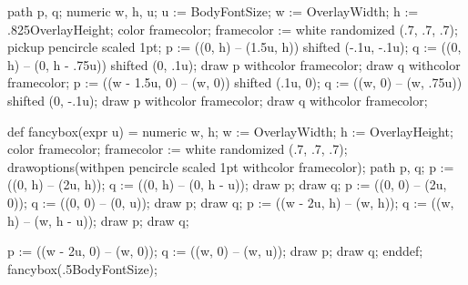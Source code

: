 \setupinteraction[state=start, focus=standard, color=darkred]
\setuppapersize[A4][A4]
\setuplayout[backspace=2.5cm,width=16.5cm,
             topspace=1.5cm,header=1.5cm,
             height=27.2cm,footer=1cm]

\setuphead[title][header=empty, footer=empty, style=\bfc, align={middle,broad}]

\setupfootnotes[textstyle=bold]
\setuppagenumbering[location={footer, right}]

\setuphead[subject][incrementnumber=list]
\setupcombinedlist[content][list={section,subject},criterium=text]

\setupwhitespace[medium]
\setupinterlinespace[line=16pt]

\def\dollar{\color[darkblue]{\tt \$}}

path p, q;
numeric w, h, u;
u := BodyFontSize;
w := OverlayWidth; h := .825OverlayHeight;
color framecolor; framecolor := white randomized (.7, .7, .7);
pickup pencircle scaled 1pt;
p := ((0, h) -- (1.5u, h)) shifted (-.1u, -.1u);
q := ((0, h) -- (0, h - .75u)) shifted (0, .1u);
draw p withcolor framecolor;
draw q withcolor framecolor;
p := ((w - 1.5u, 0) -- (w, 0)) shifted (.1u, 0);
q := ((w, 0) -- (w, .75u)) shifted (0, -.1u);
draw p withcolor framecolor;
draw q withcolor framecolor;
\stopuniqueMPgraphic
{}
\def\boxquote#1{%
  \kern.25em%
  \inframed[frame=off,background=boxquotebg,offset=0pt,loffset=.25em,roffset=.25em]{#1}%
  \kern.25em%
}

\setupexternalfigures[directory={./figures}]

\startMPinclusions
def fancybox(expr u) =
numeric w, h;
w := OverlayWidth; h := OverlayHeight;
color framecolor; framecolor := white randomized (.7, .7, .7);
drawoptions(withpen pencircle scaled 1pt withcolor framecolor);
path p, q;
p := ((0, h) -- (2u, h));
q := ((0, h) -- (0, h - u));
draw p; draw q;
p := ((0, 0) -- (2u, 0));
q := ((0, 0) -- (0, u));
draw p; draw q;
p := ((w - 2u, h) -- (w, h));
q := ((w, h) -- (w, h - u));
draw p; draw q;

p := ((w - 2u, 0) -- (w, 0));
q := ((w, 0) -- (w, u));
draw p; draw q;
enddef;
\stopMPinclusions
{}
fancybox(.5BodyFontSize);
\stopuseMPgraphic
{}


